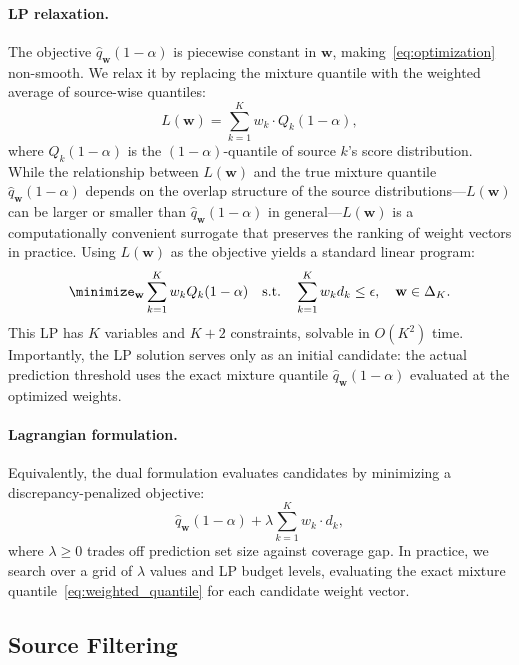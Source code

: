 \documentclass{article}
\newcommand{\qhat}{\widehat{q}}
\newcommand{\simplex}{\Delta_{K}}
\begin{document}
\paragraph{LP relaxation.}
The objective $\qhat_{\mathbf{w}}(1-\alpha)$ is piecewise constant in $\mathbf{w}$, making~\eqref{eq:optimization} non-smooth. We relax it by replacing the mixture quantile with the weighted average of source-wise quantiles:
\begin{equation}
\label{eq:lp_relaxation}
L(\mathbf{w}) = \sum_{k=1}^K w_k \cdot Q_k(1 - \alpha),
\end{equation}
where $Q_k(1-\alpha)$ is the $(1-\alpha)$-quantile of source $k$'s score distribution. While the relationship between $L(\mathbf{w})$ and the true mixture quantile $\qhat_{\mathbf{w}}(1-\alpha)$ depends on the overlap structure of the source distributions---$L(\mathbf{w})$ can be larger or smaller than $\qhat_{\mathbf{w}}(1-\alpha)$ in general---$L(\mathbf{w})$ is a computationally convenient surrogate that preserves the ranking of weight vectors in practice. Using $L(\mathbf{w})$ as the objective yields a standard linear program:
\begin{equation}
\label{eq:lp}
\minimize_{\mathbf{w}} \sum_{k=1}^K w_k Q_k(1-\alpha) \quad \text{s.t.} \quad \sum_{k=1}^K w_k d_k \leq \epsilon, \quad \mathbf{w} \in \simplex.
\end{equation}
This LP has $K$ variables and $K + 2$ constraints, solvable in $O(K^2)$ time. Importantly, the LP solution serves only as an initial candidate: the actual prediction threshold uses the exact mixture quantile $\qhat_{\mathbf{w}}(1-\alpha)$ evaluated at the optimized weights.

\paragraph{Lagrangian formulation.}
Equivalently, the dual formulation evaluates candidates by minimizing a discrepancy-penalized objective:
\begin{equation}
\label{eq:lagrangian}
\qhat_{\mathbf{w}}(1-\alpha) + \lambda \sum_{k=1}^K w_k \cdot d_k,
\end{equation}
where $\lambda \geq 0$ trades off prediction set size against coverage gap. In practice, we search over a grid of $\lambda$ values and LP budget levels, evaluating the exact mixture quantile~\eqref{eq:weighted_quantile} for each candidate weight vector.

\subsection{Source Filtering}
\label{sec:filtering}
\end{document}

